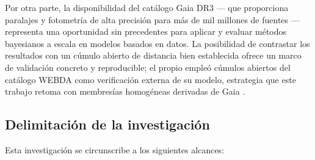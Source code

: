 \documentclass[stu, 12pt, letterpaper, donotrepeattitle, floatsintext, natbib]{apa7_ula}
\begin{document}
Por otra parte, la disponibilidad del catálogo Gaia DR3
\citep{Vallenari2022GaiaDR} --- que proporciona paralajes y fotometría
de alta precisión para más de mil millones de fuentes --- representa
una oportunidad sin precedentes para aplicar y evaluar métodos
bayesianos a escala en modelos basados en datos. La posibilidad de contrastar los resultados con
un cúmulo abierto de distancia bien establecida ofrece un marco de
validación concreto y reproducible; el propio \citet{Leistedt_2017}
empleó cúmulos abiertos del catálogo WEBDA como verificación externa
de su modelo, estrategia que este trabajo retoma con membresías
homogéneas derivadas de Gaia \citep{CantatGaudin_2018,Galli_2017}.

\subsection{Delimitación de la investigación}

Esta investigación se circunscribe a los siguientes alcances:
\end{document}
